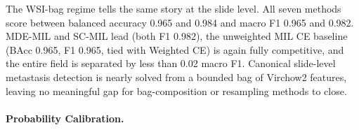 \documentclass[11pt]{article}
\begin{document}
The WSI-bag regime tells the same story at the slide level. All seven methods score between balanced accuracy \num{0.965} and \num{0.984} and macro F1 \num{0.965} and \num{0.982}. MDE-MIL and SC-MIL lead (both F1 \num{0.982}), the unweighted MIL CE baseline (BAcc \num{0.965}, F1 \num{0.965}, tied with Weighted CE) is again fully competitive, and the entire field is separated by less than \num{0.02} macro F1. Canonical slide-level metastasis detection is nearly solved from a bounded bag of Virchow2 features, leaving no meaningful gap for bag-composition or resampling methods to close.

\paragraph{Probability Calibration.}
\begin{table}[ht]
  \centering
  \caption{CAMELYON16 native patch-feature calibration: ECE before (raw) and after (TS) temperature scaling, with the fitted temperature $T$, mean $\pm$ standard deviation across seeds.}
  \label{tab:camelyon16-calibration-patch}
\end{table}

\begin{table}[ht]
  \centering
  \caption{CAMELYON16 native WSI-bag calibration: ECE before and after temperature scaling, with the fitted temperature $T$. Columns as in Table~\ref{tab:camelyon16-calibration-patch}.}
  \label{tab:camelyon16-calibration-wsi}
\end{table}
\end{document}
